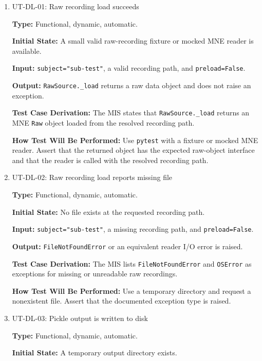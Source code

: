 \documentclass[12pt, titlepage]{article}
\begin{document}
\begin{enumerate}

\item{UT-DL-01: Raw recording load succeeds\\}

\textbf{Type:} Functional, dynamic, automatic.

\textbf{Initial State:} A small valid raw-recording fixture or mocked MNE reader is available.

\textbf{Input:} \texttt{subject="sub-test"}, a valid recording path, and \texttt{preload=False}.

\textbf{Output:} \texttt{RawSource.\_load} returns a raw data object and does not raise an exception.

\textbf{Test Case Derivation:} The MIS states that \texttt{RawSource.\_load} returns an MNE \texttt{Raw} object loaded from the resolved recording path.

\textbf{How Test Will Be Performed:} Use \texttt{pytest} with a fixture or mocked MNE reader. Assert that the returned object has the expected raw-object interface and that the reader is called with the resolved recording path.

\item{UT-DL-02: Raw recording load reports missing file\\}

\textbf{Type:} Functional, dynamic, automatic.

\textbf{Initial State:} No file exists at the requested recording path.

\textbf{Input:} \texttt{subject="sub-test"}, a missing recording path, and \texttt{preload=False}.

\textbf{Output:} \texttt{FileNotFoundError} or an equivalent reader I/O error is raised.

\textbf{Test Case Derivation:} The MIS lists \texttt{FileNotFoundError} and \texttt{OSError} as exceptions for missing or unreadable raw recordings.

\textbf{How Test Will Be Performed:} Use a temporary directory and request a nonexistent file. Assert that the documented exception type is raised.

\item{UT-DL-03: Pickle output is written to disk\\}

\textbf{Type:} Functional, dynamic, automatic.

\textbf{Initial State:} A temporary output directory exists.


\end{enumerate}
\end{document}
